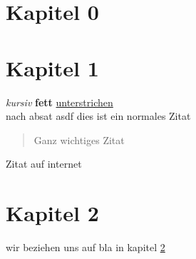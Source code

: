 \chapter{Kapitel 0}

\chapter{Kapitel 1}
\label{kapt1}

\textit{kursiv}
\textbf{fett}
\underline{unterstrichen}\\
nach absat
asdf
\titel
dies ist ein normales Zitat\cite{Autor.1992}
\begin{quote}
	Ganz wichtiges Zitat\cite{Abc.2018}
\end{quote}
Zitat auf internet\cite{internet}


\chapter{Kapitel 2}

wir beziehen uns auf bla in kapitel \ref{kapt1}
